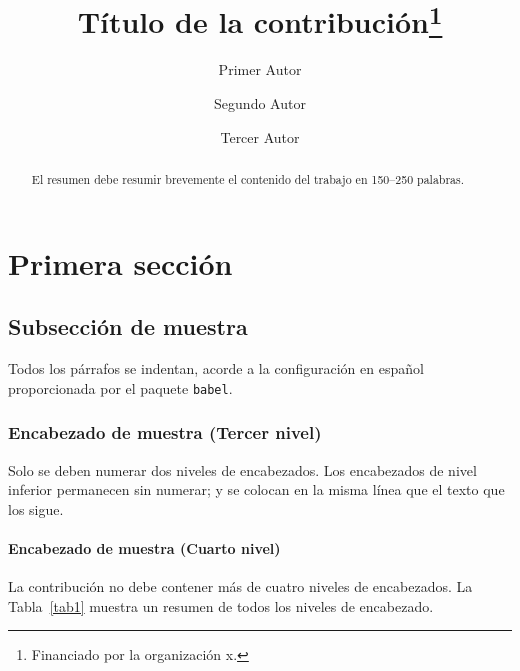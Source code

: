 \documentclass[runningheads]{sistedes}
\begin{document}
%
\title{Título de la contribución\thanks{Financiado por la organización x.}}
%
%
\author{Primer Autor \and
Segundo Autor \and
Tercer Autor}
%
%

%
\maketitle              %
%
\begin{abstract}
El resumen debe resumir brevemente el contenido del trabajo en
150--250 palabras.

\end{abstract}
%
%
%
\section{Primera sección}
\subsection{Subsección de muestra}
Todos los párrafos se indentan, acorde a la configuración en español 
proporcionada por el paquete \verb|babel|.

\subsubsection{Encabezado de muestra (Tercer nivel)}
Solo se deben numerar dos niveles de encabezados. Los encabezados de nivel
inferior permanecen sin numerar; y se colocan en la misma línea que el texto
que los sigue.

\paragraph{Encabezado de muestra (Cuarto nivel)}
La contribución no debe contener más de cuatro niveles de encabezados.
La Tabla~\ref{tab1} muestra un resumen de todos los niveles de encabezado.
\end{document}

